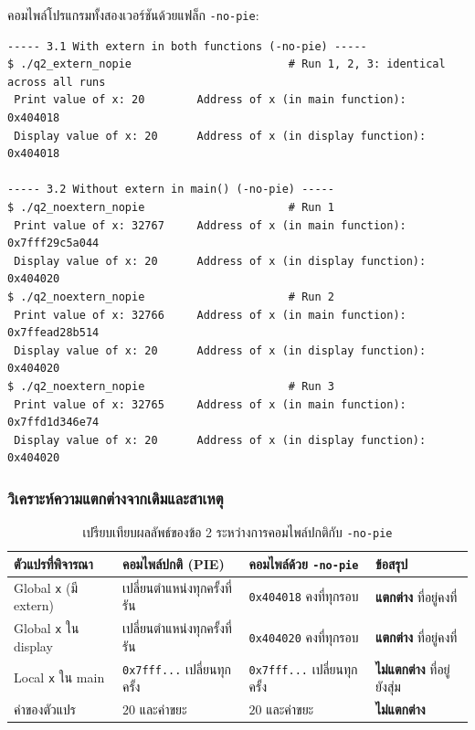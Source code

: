 \documentclass[a4paper,11pt]{article}
\newcommand{\code}[1]{\texttt{#1}}
\begin{document}
คอมไพล์โปรแกรมทั้งสองเวอร์ชันด้วยแฟล็ก \code{-no-pie}:

\begin{lstlisting}[style=terminal,caption={ผลการทดลอง Step 4 เมื่อใช้แฟล็ก \code{-no-pie}}]
----- 3.1 With extern in both functions (-no-pie) -----
$ ./q2_extern_nopie                        # Run 1, 2, 3: identical across all runs
 Print value of x: 20        Address of x (in main function):    0x404018
 Display value of x: 20      Address of x (in display function): 0x404018

----- 3.2 Without extern in main() (-no-pie) -----
$ ./q2_noextern_nopie                      # Run 1
 Print value of x: 32767     Address of x (in main function):    0x7fff29c5a044
 Display value of x: 20      Address of x (in display function): 0x404020
$ ./q2_noextern_nopie                      # Run 2
 Print value of x: 32766     Address of x (in main function):    0x7ffead28b514
 Display value of x: 20      Address of x (in display function): 0x404020
$ ./q2_noextern_nopie                      # Run 3
 Print value of x: 32765     Address of x (in main function):    0x7ffd1d346e74
 Display value of x: 20      Address of x (in display function): 0x404020
\end{lstlisting}

\subsubsection{วิเคราะห์ความแตกต่างจากเดิมและสาเหตุ}

\begin{table}[H]
\centering\small
\caption{เปรียบเทียบผลลัพธ์ของข้อ 2 ระหว่างการคอมไพล์ปกติกับ \code{-no-pie}}
\begin{tabular}{p{3.2cm}p{4.0cm}p{3.8cm}p{3.0cm}}
\toprule
\textbf{ตัวแปรที่พิจารณา} & \textbf{คอมไพล์ปกติ (PIE)} & \textbf{คอมไพล์ด้วย \code{-no-pie}} & \textbf{ข้อสรุป} \\
\midrule
Global \code{x} (มี extern) & เปลี่ยนตำแหน่งทุกครั้งที่รัน & \code{0x404018} คงที่ทุกรอบ & \textbf{แตกต่าง} ที่อยู่คงที่ \\
Global \code{x} ใน display & เปลี่ยนตำแหน่งทุกครั้งที่รัน & \code{0x404020} คงที่ทุกรอบ & \textbf{แตกต่าง} ที่อยู่คงที่ \\
Local \code{x} ใน main & \code{0x7fff...} เปลี่ยนทุกครั้ง & \code{0x7fff...} เปลี่ยนทุกครั้ง & \textbf{ไม่แตกต่าง} ที่อยู่ยังสุ่ม \\
ค่าของตัวแปร & $20$ และค่าขยะ & $20$ และค่าขยะ & \textbf{ไม่แตกต่าง} \\
\bottomrule
\end{tabular}
\end{table}
\end{document}
